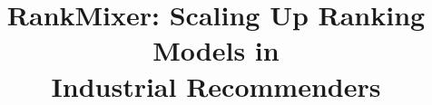 \documentclass[sigconf]{acmart}
\begin{document}
\title[RankMixer: Scaling Up Ranking Models in Industrial Recommenders]{RankMixer: Scaling Up Ranking Models in  \\Industrial Recommenders}















\end{document}
